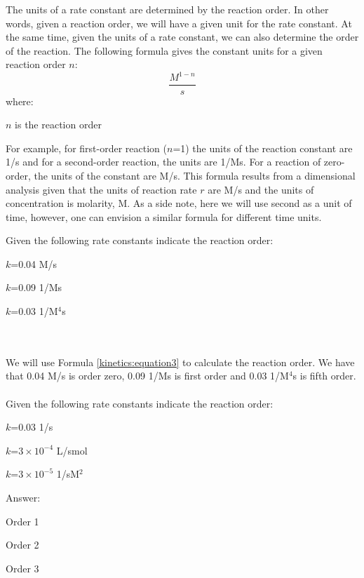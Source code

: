 \documentclass[main.tex]{subfiles}
\newcommand\chapterlabel{kinetics}
\begin{document}
\begin{description}
The units of a rate constant are determined by the reaction order. In other words, given a reaction order, we will have a given unit for the rate constant. At the same time, given the units of a rate constant, we can also determine the order of the reaction. The following formula gives the constant units for a given reaction order $n$:
\begin{equation}
\boxed{\frac{M^{1-n}}{s} }
\label{\chapterlabel:equation3}
\end{equation}
where:
\begin{where}
 \item $n$   is the reaction order
\end{where}
For example, for first-order reaction ($n$=1) the units of the reaction constant are 1/s and for a second-order reaction, the units are 1/Ms. For a reaction of zero-order, the units of the constant are M/s. This formula results from a dimensional analysis given that the units of reaction rate $r$ are M/s and the units of concentration is molarity, M. As a side note, here we will use second as a unit of time, however, one can envision a similar formula for different time units.
\begin{example} %
Given the following rate constants indicate the reaction order:
\begin{inparaenum}[(a)]	
\item  $k$=0.04 M/s
\item	 $k$=0.09 1/Ms 
\item  $k$=0.03 1/M$^4$s
\end{inparaenum} \\
\\
We will use Formula \ref{\chapterlabel:equation3} to calculate the reaction order. We have that 0.04 M/s is order zero, 0.09 1/Ms is first order and 0.03 1/M$^4$s is fifth order.
\\\faDiamond\ \\
Given the following rate constants indicate the reaction order:
\begin{inparaenum}[(a)]	
\item $k$=0.03 1/s
\item	 $k$=$3\times 10^{-4}$ L/smol
\item  $k$=$3\times 10^{-5}$ 1/sM$^2$
\end{inparaenum} 
\flushright Answer:   
\begin{inparaenum}[(a)]	
\item Order 1
\item	 Order 2
\item  Order 3
\end{inparaenum}
\end{example}%


\end{description}
\end{document}
